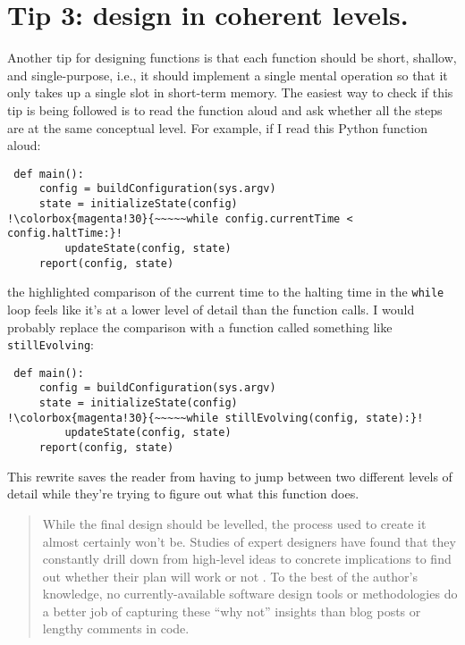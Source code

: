 \documentclass[10pt,letterpaper]{article}
\begin{document}
\section*{Tip 3: design in coherent levels.}

Another tip for designing functions is that
each function should be short, shallow, and single-purpose,
i.e.,
it should implement a single mental operation
so that it only takes up a single slot in short-term memory.
The easiest way to check if this tip is being followed
is to read the function aloud
and ask whether all the steps are at the same conceptual level.
For example,
if I read this Python function aloud:

\begin{lstlisting}
 def main():
     config = buildConfiguration(sys.argv)
     state = initializeState(config)
!\colorbox{magenta!30}{~~~~~while config.currentTime < config.haltTime:}!
         updateState(config, state)
     report(config, state)
\end{lstlisting}

\noindent
the highlighted comparison of the current time to the halting time in the \texttt{while} loop
feels like it's at a lower level of detail than the function calls.
I would probably replace the comparison with a function called something like \texttt{stillEvolving}:

\begin{lstlisting}
 def main():
     config = buildConfiguration(sys.argv)
     state = initializeState(config)
!\colorbox{magenta!30}{~~~~~while stillEvolving(config, state):}!
         updateState(config, state)
     report(config, state)
\end{lstlisting}

\noindent
This rewrite saves the reader
from having to jump between two different levels of detail
while they're trying to figure out what this function does.

\begin{quotation}
  \noindent
  While the final design should be levelled,
  the process used to create it almost certainly won't be.
  Studies of expert designers have found that
  they constantly drill down from high-level ideas to concrete implications
  to find out whether their plan will work or not \cite{Schon1984}.
  To the best of the author's knowledge,
  no currently-available software design tools or methodologies do a better job of capturing these ``why not'' insights
  than blog posts or lengthy comments in code.
\end{quotation}
\end{document}
